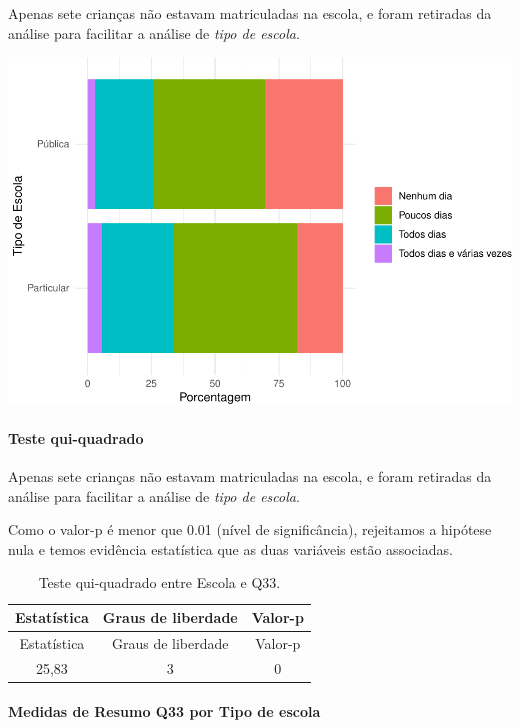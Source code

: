 \documentclass[]{article}
\let\oldparagraph\paragraph
\renewcommand{\paragraph}[1]{\oldparagraph{#1}\mbox{}}
\begin{document}
Apenas sete crianças não estavam matriculadas na escola, e foram retiradas da análise para facilitar a análise de \emph{tipo de escola}.

\begin{center}\includegraphics[width=0.75\linewidth]{relatorio_covid19_files/figure-latex/unnamed-chunk-1175-1} \end{center}

\hypertarget{teste-qui-quadrado-101}{%
\paragraph{Teste qui-quadrado}\label{teste-qui-quadrado-101}}

Apenas sete crianças não estavam matriculadas na escola, e foram retiradas da análise para facilitar a análise de \emph{tipo de escola}.

Como o valor-p é menor que 0.01 (nível de significância), rejeitamos a hipótese nula e temos evidência estatística que as duas variáveis estão associadas.

\begin{longtable}[]{@{}ccc@{}}
\caption{\label{tab:unnamed-chunk-1177}Teste qui-quadrado entre Escola e Q33.}\tabularnewline
\toprule
Estatística & Graus de liberdade & Valor-p\tabularnewline
\midrule
\endfirsthead
\toprule
Estatística & Graus de liberdade & Valor-p\tabularnewline
\midrule
\endhead
25,83 & 3 & 0\tabularnewline
\bottomrule
\end{longtable}

\cleardoublepage

\hypertarget{medidas-de-resumo-q33-por-tipo-de-escola}{%
\paragraph{Medidas de Resumo Q33 por Tipo de escola}\label{medidas-de-resumo-q33-por-tipo-de-escola}}
\end{document}

